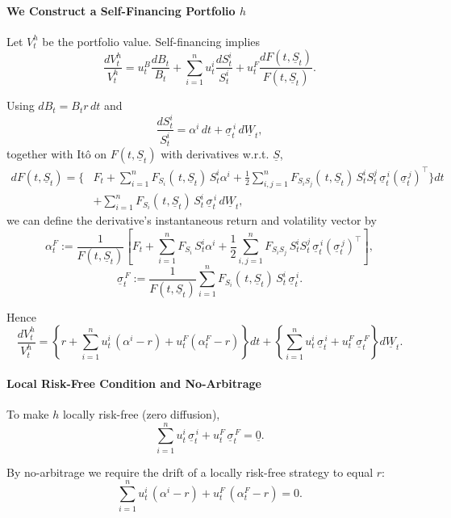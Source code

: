 \documentclass[12pt,a4paper]{article}
\theoremstyle{definition}
\begin{document}
\paragraph{We Construct a Self-Financing Portfolio $h$}

Let $V_t^h$ be the portfolio value. Self-financing implies
\[
\frac{dV_t^h}{V_t^h} = u_t^B \frac{dB_t}{B_t} + \sum_{i=1}^n u_t^i \frac{dS_t^i}{S_t^i} + u_t^F \frac{dF(t, \underline{S}_t)}{F(t, \underline{S}_t)}.
\]

Using $dB_t = B_t r \, dt$ and
\[
\frac{dS_t^i}{S_t^i} = \alpha^i \, dt + \underline{\sigma}_t^{\,i} \, d\underline{W}_t,
\]
together with Itô on $F(t, \underline{S}_t)$ with derivatives w.r.t. $\underline{S}$,
\[
\begin{aligned}
dF(t, \underline{S}_t) = \Bigg\{ & F_t + \sum_{i=1}^n F_{S_i}(\,t, \underline{S}_t) \, S_t^i \alpha^i + \frac{1}{2} \sum_{i,j=1}^n F_{S_i S_j}(\,t, \underline{S}_t) \, S_t^i S_t^j \, \underline{\sigma}_t^{\,i} (\underline{\sigma}_t^{\,j})^\top \Bigg\} dt \\
& + \sum_{i=1}^n F_{S_i}(\,t, \underline{S}_t) \, S_t^i \, \underline{\sigma}_t^{\,i} \, d\underline{W}_t,
\end{aligned}
\]
we can define the derivative's instantaneous return and volatility vector by
\[
\alpha_t^F := \frac{1}{F(t, \underline{S}_t)} \left[F_t + \sum_{i=1}^n F_{S_i} \, S_t^i \alpha^i + \frac{1}{2} \sum_{i,j=1}^n F_{S_i S_j} \, S_t^i S_t^j \, \underline{\sigma}_t^{\,i} (\underline{\sigma}_t^{\,j})^\top\right],
\]
\[
\underline{\sigma}_t^{\,F} := \frac{1}{F(t, \underline{S}_t)} \sum_{i=1}^n F_{S_i}(\,t, \underline{S}_t) \, S_t^i \, \underline{\sigma}_t^{\,i}.
\]

Hence
\[
\frac{dV_t^h}{V_t^h} = \left\{r + \sum_{i=1}^n u_t^i \, (\alpha^i - r) + u_t^F (\alpha_t^F - r)\right\} dt + \left\{\sum_{i=1}^n u_t^i \, \underline{\sigma}_t^{\,i} + u_t^F \, \underline{\sigma}_t^{\,F}\right\} d\underline{W}_t.
\]

\paragraph{Local Risk-Free Condition and No-Arbitrage}

To make $h$ locally risk-free (zero diffusion),
\[
\sum_{i=1}^n u_t^i \, \underline{\sigma}_t^{\,i} + u_t^F \, \underline{\sigma}_t^{\,F} = \underline{0}. \tag{$\bullet$}
\]

By no-arbitrage we require the drift of a locally risk-free strategy to equal $r$:
\[
\sum_{i=1}^n u_t^i \, (\alpha^i - r) + u_t^F \, (\alpha_t^F - r) = 0. \tag{$\bullet\bullet$}
\]
\end{document}
